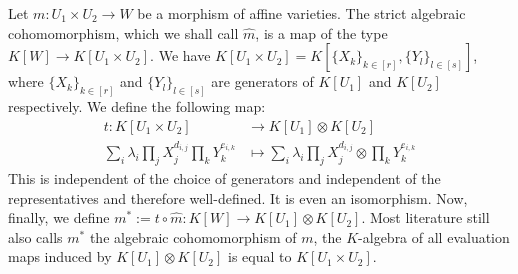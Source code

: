 \begin{definition}\label{coh}
  Let $m \colon U_1 \times U_2 \longrightarrow W$ be a morphism of affine varieties.
  The strict algebraic cohomomorphism, which we shall call $\hat{m}$, is a map of the type $K[W] \longrightarrow K[U_1 \times U_2]$.
  We have $ K[U_1 \times U_2] = K[\{X_k\}_{k\in[r]},\{Y_l\}_{l\in[s]}]$, where $\{X_k\}_{k\in[r]}$ and $\{Y_l\}_{l\in[s]}$ are generators of $K[U_1]$ and $K[U_2]$ respectively.
  We define the following map:
    \begin{equation}
    \begin{aligned}
      t \colon K[U_1 \times U_2]
      & \longrightarrow K[U_1] \otimes K[U_2]\\
      \sum_i \lambda_i \prod_j X_{j}^{d_{i,j}} \prod_k Y_{k}^{e_{i,k}} &\longmapsto \sum_i \lambda_i \prod_j X_{j}^{d_{i,j}} \otimes \prod_k Y_{k}^{e_{i,k}}
    \end{aligned}
  \end{equation}
  This is independent of the choice of generators and independent of the representatives and therefore well-defined.
  It is even an isomorphism.
  Now, finally, we define $m^\ast := t \circ \hat{m} : K[W] \longrightarrow K[U_1] \otimes K[U_2]$.
  Most literature still also calls $m^\ast$ the algebraic cohomomorphism of $m$, the $K$-algebra of all evaluation maps induced by $K[U_1] \otimes K[U_2]$ is equal to $K[U_1 \times U_2]$.
\end{definition}

